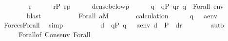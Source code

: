\begin{isabellebody}
\ \ \isamarkupfalse%
\isanewline
\ \ \ \ \isamarkupfalse%
\ r\isanewline
\ \ \ \ \isamarkupfalse%
\ {\isachardoublequoteopen}r{\isasymin}P{\isachardoublequoteclose}\ {\isachardoublequoteopen}r{\isasympreceq}p{\isachardoublequoteclose}\isanewline
\ \ \ \ \isamarkupfalse%
\ {\isacartoucheopen}dense{\isacharunderscore}{\kern0pt}below{\isacharparenleft}{\kern0pt}{\isacharunderscore}{\kern0pt}{\isacharcomma}{\kern0pt}p{\isacharparenright}{\kern0pt}{\isacartoucheclose}\isanewline
\ \ \ \ \isamarkupfalse%
\ q\ \ {\isachardoublequoteopen}q{\isasymin}P{\isachardoublequoteclose}\ {\isachardoublequoteopen}q{\isasympreceq}r{\isachardoublequoteclose}\ {\isachardoublequoteopen}q\ {\isasymtturnstile}\ Forall{\isacharparenleft}{\kern0pt}{\isasymphi}{\isacharparenright}{\kern0pt}\ env{\isachardoublequoteclose}\isanewline
\ \ \ \ \ \ \isamarkupfalse%
\ blast\isanewline
\ \ \ \ \isamarkupfalse%
\isanewline
\ \ \ \ \isamarkupfalse%
\ Forall\ {\isacartoucheopen}a{\isasymin}M{\isacartoucheclose}\isanewline
\ \ \ \ \isamarkupfalse%
\ \isamarkupfalse%
\ calculation\isanewline
\ \ \ \ \isamarkupfalse%
\ {\isachardoublequoteopen}q\ {\isasymtturnstile}\ {\isasymphi}\ {\isacharparenleft}{\kern0pt}{\isacharbrackleft}{\kern0pt}a{\isacharbrackright}{\kern0pt}{\isacharat}{\kern0pt}env{\isacharparenright}{\kern0pt}{\isachardoublequoteclose}\isanewline
\ \ \ \ \ \ \isamarkupfalse%
\ Forces{\isacharunderscore}{\kern0pt}Forall\ \isamarkupfalse%
\ simp\isanewline
\ \ \ \ \isamarkupfalse%
\isanewline
\ \ \ \ \isamarkupfalse%
\ {\isachardoublequoteopen}{\isasymexists}d\ {\isasymin}\ {\isacharbraceleft}{\kern0pt}q{\isasymin}P{\isachardot}{\kern0pt}\ q\ {\isasymtturnstile}\ {\isasymphi}\ {\isacharparenleft}{\kern0pt}{\isacharbrackleft}{\kern0pt}a{\isacharbrackright}{\kern0pt}{\isacharat}{\kern0pt}env{\isacharparenright}{\kern0pt}{\isacharbraceright}{\kern0pt}{\isachardot}{\kern0pt}\ d\ {\isasymin}\ P\ {\isasymand}\ d{\isasympreceq}r{\isachardoublequoteclose}\isanewline
\ \ \ \ \ \ \isamarkupfalse%
\ auto\isanewline
\ \ \isamarkupfalse%
\isanewline
\ \ \isamarkupfalse%
\ \isanewline
\ \ \isamarkupfalse%
\ Forall{\isacharparenleft}{\kern0pt}{}{\isacharparenright}{\kern0pt}{\isacharbrackleft}{\kern0pt}of\ {\isachardoublequoteopen}Cons{\isacharparenleft}{\kern0pt}{\isacharunderscore}{\kern0pt}{\isacharcomma}{\kern0pt}env{\isacharparenright}{\kern0pt}{\isachardoublequoteclose}{\isacharbrackright}{\kern0pt}\ Forall{\isacharparenleft}{\kern0pt}{}{\isacharcomma}{\kern0pt}{}{\isacharminus}{\kern0pt}{}{\isacharparenright}{\kern0pt}\isanewline

\end{isabellebody}
